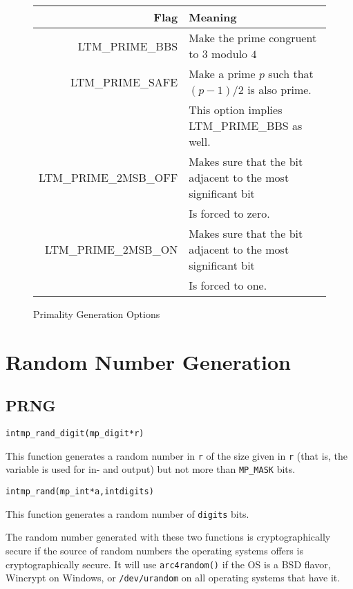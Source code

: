\documentclass[synpaper]{book}
\begin{document}
\begin{figure}[h]
\begin{center}
\begin{small}
\begin{tabular}{|r|l|}
\hline \textbf{Flag}         & \textbf{Meaning} \\
\hline LTM\_PRIME\_BBS       & Make the prime congruent to $3$ modulo $4$ \\
\hline LTM\_PRIME\_SAFE      & Make a prime $p$ such that $(p - 1)/2$ is also prime. \\
                             & This option implies LTM\_PRIME\_BBS as well. \\
\hline LTM\_PRIME\_2MSB\_OFF & Makes sure that the bit adjacent to the most significant bit \\
                             & Is forced to zero.  \\
\hline LTM\_PRIME\_2MSB\_ON  & Makes sure that the bit adjacent to the most significant bit \\
                             & Is forced to one. \\
\hline
\end{tabular}
\end{small}
\end{center}
\caption{Primality Generation Options}
\label{fig:primeopts}
\end{figure}

\chapter{Random Number Generation}
\section{PRNG}
\begin{alltt}
int mp_rand_digit(mp_digit *r)
\end{alltt}
This function generates a random number in \texttt{r} of the size given in \texttt{r} (that is, the variable is used for in- and output) but not more than \texttt{MP\_MASK} bits.

\begin{alltt}
int mp_rand(mp_int *a, int digits)
\end{alltt}
This function generates a random number of \texttt{digits} bits.

The random number generated with these two functions is cryptographically secure if the source of random numbers the operating systems offers is cryptographically secure. It will use \texttt{arc4random()} if the OS is a BSD flavor, Wincrypt on Windows, or \texttt{/dev/urandom} on all operating systems that have it.
\end{document}
